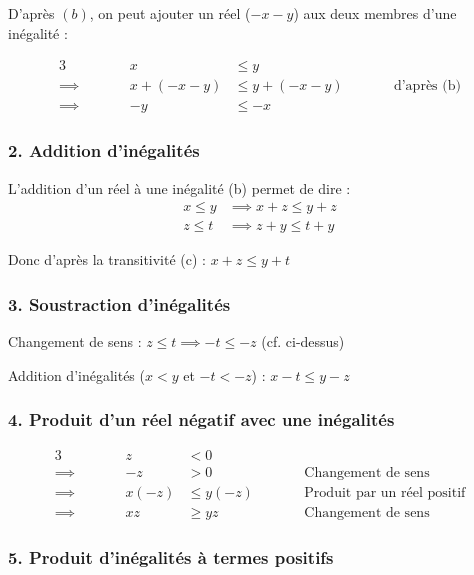 \documentclass{report}
\begin{document}
D'après $(b)$, on peut ajouter un réel ($-x-y$) aux deux membres d'une inégalité :

\begin{alignat*}{3}
	        &         &          x &\leq y \\
	\implies& \qquad  &   x+(-x-y) &\leq y+(-x-y) &\qquad& \text{d'après (b)}\\
	\implies&         &         -y &\leq -x
\end{alignat*}


\subsubsection*{2. Addition d'inégalités}

L'addition d'un réel à une inégalité (b) permet de dire :
\begin{displaymath}
	\begin{split}
x \leq y & \implies x  + z\leq y + z \\
z \leq t & \implies z + y \leq t + y
	\end{split}
\end{displaymath}

Donc d'après la transitivité (c) : $ x  + z \leq y + t$ 

\subsubsection*{3. Soustraction d'inégalités}
 
Changement de sens : $z \leq t \implies -t \leq -z$ (cf. ci-dessus)

Addition d'inégalités ($x<y$ et $-t<-z$) : $x - t \leq y - z$ 

\subsubsection*{4. Produit d'un réel négatif avec une inégalités}

\begin{alignat*}{3}
	        &         &     z &< 0 \\
	\implies& \qquad  &    -z &> 0        &\qquad& \text{Changement de sens}\\
	\implies&         & x(-z) &\leq y(-z) &      & \text{Produit par un réel positif}\\
	\implies&         &    xz &\geq yz    &      & \text{Changement de sens}
\end{alignat*}

\subsubsection*{5. Produit d'inégalités à termes positifs}
\end{document}
